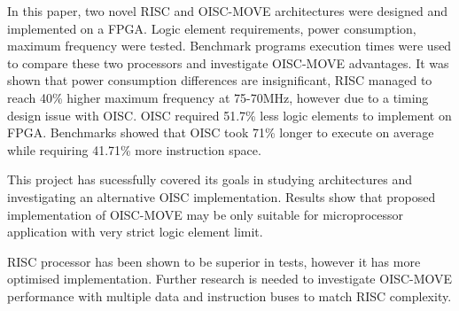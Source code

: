 \iffalse
The final chapter is short and sweet, to the point:
 what did you really accomplish? 
 What significant result can you claim and how it differs from anything done before. 
 How well did you meet your goal? 
 Now step out one level, then another indicating the impact your work will have on the literature and on future endeavours.
 * Start with the specifics and end with the general.
 * Summarise key result; mention limitations, note anything unexpected.
\fi

In this paper, two novel RISC and OISC-MOVE architectures were designed and implemented on a FPGA. Logic element requirements, power consumption, maximum frequency were tested. Benchmark programs execution times were used to compare these two processors and investigate OISC-MOVE advantages. It was shown that power consumption differences are insignificant, RISC managed to reach 40\% higher maximum frequency at 75-70MHz, however due to a timing design issue with OISC. OISC required 51.7\% less logic elements to implement on FPGA. Benchmarks showed that OISC took 71\% longer to execute on average while requiring 41.71\% more instruction space. 

This project has sucessfully covered its goals in studying architectures and investigating an alternative OISC implementation. Results show that proposed implementation of OISC-MOVE may be only suitable for microprocessor application with very strict logic element limit. 

RISC processor has been shown to be superior in tests, however it has more optimised implementation. Further research is needed to investigate OISC-MOVE performance with multiple data and instruction buses to match RISC complexity. 
